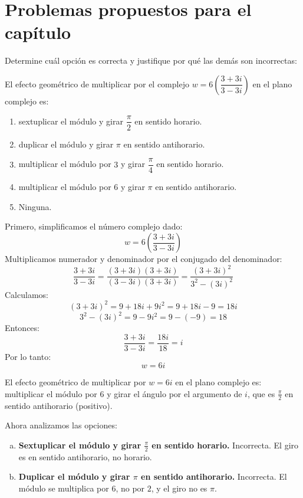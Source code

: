 \section{Problemas propuestos para el capítulo}

\begin{prob} Determine cuál opción es correcta y justifique por qué las demás son incorrectas:

El efecto geométrico de multiplicar por el complejo $w=6\left(\dfrac{3+3i}{3-3i}\right)$ en el plano complejo es:

\begin{enumerate}[$(a)$]
\item sextuplicar el módulo y girar $\dfrac{\pi}{2}$ en sentido horario.
\item duplicar el módulo y girar $\pi$ en sentido antihorario.
\item multiplicar el módulo por $3$ y girar $\dfrac{\pi}{4}$ en sentido horario.
\item multiplicar el módulo por $6$ y girar $\pi$ en sentido antihorario.
\item Ninguna.					
\end{enumerate}


\begin{myproof}
Primero, simplificamos el número complejo dado:
$$
w = 6\left(\frac{3+3i}{3-3i}\right)
$$
Multiplicamos numerador y denominador por el conjugado del denominador:
$$
\frac{3+3i}{3-3i} = \frac{(3+3i)(3+3i)}{(3-3i)(3+3i)} = \frac{(3+3i)^2}{3^2 - (3i)^2}
$$
Calculamos:
$$
(3+3i)^2 = 9 + 18i + 9i^2 = 9 + 18i - 9 = 18i
$$
$$
3^2 - (3i)^2 = 9 - 9i^2 = 9 - (-9) = 18
$$
Entonces:
$$
\frac{3+3i}{3-3i} = \frac{18i}{18} = i
$$
Por lo tanto:
$$
w = 6i
$$

El efecto geométrico de multiplicar por $w=6i$ en el plano complejo es:  multiplicar el módulo por $6$ y girar el ángulo por el argumento de $i$, que es $\frac{\pi}{2}$ en sentido antihorario (positivo).

Ahora analizamos las opciones:

\begin{enumerate}[(a)]
\item \textbf{Sextuplicar el módulo y girar $\frac{\pi}{2}$ en sentido horario.}  
Incorrecta. El giro es en sentido antihorario, no horario.

\item \textbf{Duplicar el módulo y girar $\pi$ en sentido antihorario.}  
Incorrecta. El módulo se multiplica por $6$, no por $2$, y el giro no es $\pi$.


\end{enumerate}
\end{myproof}
\end{prob}
